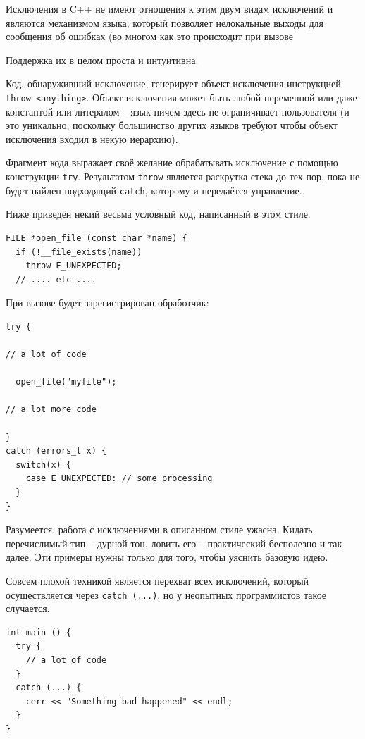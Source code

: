 \documentclass[a4paper,12pt,oneside]{book}
\begin{document}
Исключения в C++ не имеют отношения к этим двум видам исключений и являются механизмом языка, который позволяет нелокальные выходы для сообщения об ошибках (во многом как это происходит при вызове 

Поддержка их в целом проста и интуитивна.

Код, обнаруживший исключение, генерирует объект исключения инструкцией \lstinline!throw <anything>!. Объект исключения может быть любой переменной или даже константой или литералом -- язык ничем здесь не ограничивает пользователя (и это уникально, поскольку большинство других языков требуют чтобы объект исключения входил в некую иерархию). 

Фрагмент кода выражает своё желание обрабатывать исключение с помощью конструкции \lstinline!try!. Результатом \lstinline!throw! является раскрутка стека до тех пор, пока не будет найден подходящий \lstinline!catch!, которому и передаётся управление.

Ниже приведён некий весьма условный код, написанный в этом стиле.

\begin{lstlisting}
FILE *open_file (const char *name) {
  if (!__file_exists(name))
    throw E_UNEXPECTED;
  // .... etc ....
\end{lstlisting}

При вызове будет зарегистрирован обработчик:

\begin{lstlisting}
try {

// a lot of code

  open_file("myfile");

// a lot more code

}
catch (errors_t x) {
  switch(x) {
    case E_UNEXPECTED: // some processing    
  }
}
\end{lstlisting}

Разумеется, работа с исключениями в описанном стиле ужасна. Кидать перечислимый тип -- дурной тон, ловить его -- практический бесполезно и так далее. Эти примеры нужны только для того, чтобы уяснить базовую идею.

Совсем плохой техникой является перехват всех исключений, который осуществляется через \lstinline!catch (...)!, но у неопытных программистов такое случается.

\begin{lstlisting}
int main () {
  try {
    // a lot of code
  }
  catch (...) {
    cerr << "Something bad happened" << endl;
  }
}
\end{lstlisting}
\end{document}
